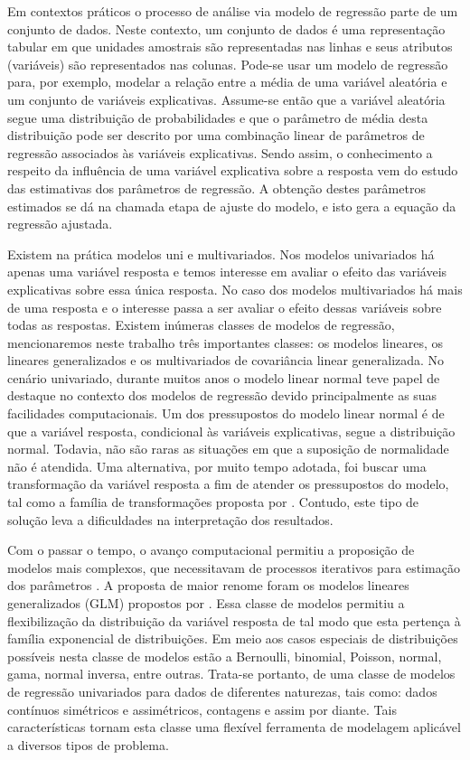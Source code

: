 Em contextos práticos o processo de análise via modelo de regressão parte de um conjunto de dados. Neste contexto, um conjunto de dados é uma representação tabular em que unidades amostrais são representadas nas linhas e seus atributos (variáveis) são representados nas colunas. Pode-se usar um modelo de regressão para, por exemplo, modelar a relação entre a média de uma variável aleatória e um conjunto de variáveis explicativas. Assume-se então que a variável aleatória segue uma distribuição de probabilidades e que o parâmetro de média desta distribuição pode ser descrito por uma combinação linear de parâmetros de regressão associados às variáveis explicativas. Sendo assim, o conhecimento a respeito da influência de uma variável explicativa sobre a resposta vem do estudo das estimativas dos parâmetros de regressão. A obtenção destes parâmetros estimados se dá na chamada etapa de ajuste do modelo, e isto gera a equação da regressão ajustada.

Existem na prática modelos uni e multivariados. Nos modelos univariados há apenas uma variável resposta e temos interesse em avaliar o efeito das variáveis explicativas sobre essa única resposta. No caso dos modelos multivariados há mais de uma resposta e o interesse passa a ser avaliar o efeito dessas variáveis sobre todas as respostas. Existem inúmeras classes de modelos de regressão, mencionaremos neste trabalho três importantes classes: os modelos lineares, os lineares generalizados e os multivariados de covariância linear generalizada. No cenário univariado, durante muitos anos o modelo linear normal \citep{galton} teve papel de destaque no contexto dos modelos de regressão devido principalmente as suas facilidades computacionais. Um dos pressupostos do modelo linear normal é de que a variável resposta, condicional às variáveis explicativas, segue a distribuição normal. Todavia, não são raras as situações em que a suposição de normalidade não é atendida. Uma alternativa, por muito tempo adotada, foi buscar uma transformação da variável resposta a fim de atender os pressupostos do modelo, tal como a família de transformações proposta por \citet{boxcox64}. Contudo, este tipo de solução leva a dificuldades na interpretação dos resultados.

Com o passar o tempo, o avanço computacional permitiu a proposição de modelos mais complexos, que necessitavam de processos iterativos para estimação dos parâmetros \citep{paula}. A proposta de maior renome foram os modelos lineares generalizados (GLM) propostos por \citet{Nelder72}. Essa classe de modelos permitiu a flexibilização da distribuição da variável resposta de tal modo que esta pertença à família exponencial de distribuições. Em meio aos casos especiais de distribuições possíveis nesta classe de modelos estão a Bernoulli, binomial, Poisson, normal, gama, normal inversa, entre outras. Trata-se portanto, de uma classe de modelos de regressão univariados para dados de diferentes naturezas, tais como: dados contínuos simétricos e assimétricos, contagens e assim por diante. Tais características tornam esta classe uma flexível ferramenta de modelagem aplicável a diversos tipos de problema. 

